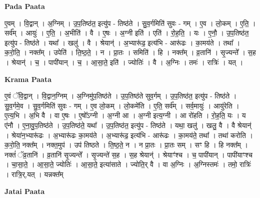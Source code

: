 \documentclass[17pt]{extarticle}
\begin{document}
\textbf{Pada Paata} \newline

ए॒वम् । वि॒द्वान् । अ॒ग्निम् । उ॒प॒तिष्ठ॑त॒ इत्यु॑प - तिष्ठ॑ते । सु॒व॒र्गमिति॑ सुवः - गम् । ए॒व । लो॒कम् । ए॒ति॒ । सर्व᳚म् । आयुः॑ । ए॒ति॒ । अ॒भीति॑ । वै । ए॒षः । अ॒ग्नी इति॑ । एति॑ । रो॒ह॒ति॒ । यः । ए॒नौ॒ । उ॒प॒तिष्ठ॑त॒ इत्यु॑प - तिष्ठ॑ते । यथा᳚ । खलु॑ । वै । श्रेयान्॑ । अ॒भ्यारू॑ढ॒ इत्य॑भि - आरू॑ढः । का॒मय॑ते । तथा᳚ । क॒रो॒ति॒ । नक्त᳚म् । उपेति॑ । ति॒ष्ठ॒ते॒ । न । प्रा॒तः । समिति॑ । हि । नक्त᳚म् । व्र॒तानि॑ । सृ॒ज्यन्ते᳚ । स॒ह । श्रेयान्॑ । च॒ । पापी॑यान् । च॒ । आ॒सा॒ते॒ इति॑ । ज्योतिः॑ । वै । अ॒ग्निः । तमः॑ । रात्रिः॑ । यत् ।  \newline


\textbf{Krama Paata} \newline

ए॒वं ॅवि॒द्वान् । वि॒द्वान॒ग्निम् । अ॒ग्निमु॑प॒तिष्ठ॑ते । उ॒प॒तिष्ठ॑ते सुव॒र्गम् । उ॒प॒तिष्ठ॑त॒ इत्यु॑प - तिष्ठ॑ते । सु॒व॒र्गमे॒व । सु॒व॒र्गमिति॑ सुवः - गम् । ए॒व लो॒कम् । लो॒कमे॑ति । ए॒ति॒ सर्व᳚म् । सर्व॒मायुः॑ । आयु॑रेति । ए॒त्य॒भि । अ॒भि वै । वा ए॒षः । ए॒षो᳚ऽग्नी । अ॒ग्नी आ । अ॒ग्नी इत्य॒ग्नी । आ रो॑हति । रो॒ह॒ति॒ यः । य ए॑नौ । ए॒ना॒वु॒प॒तिष्ठ॑ते । उ॒प॒तिष्ठ॑ते॒ यथा᳚ । उ॒प॒तिष्ठ॑त॒ इत्यु॑प - तिष्ठ॑ते । यथा॒ खलु॑ । खलु॒ वै । वै श्रेयान्॑ । श्रेया॑न॒भ्यारू॑ढः । अ॒भ्यारू॑ढः का॒मय॑ते । अ॒भ्यारू॑ढ॒ इत्य॑भि - आरू॑ढः । का॒मय॑ते॒ तथा᳚ । तथा॑ करोति । क॒रो॒ति॒ नक्त᳚म् । नक्त॒मुप॑ । उप॑ तिष्ठते । ति॒ष्ठ॒ते॒ न । न प्रा॒तः । प्रा॒तः सम् । सꣳ हि । हि नक्त᳚म् । नक्तं॑ ॅव्र॒तानि॑ । व्र॒तानि॑ सृ॒ज्यन्ते᳚ । सृ॒ज्यन्ते॑ स॒ह । स॒ह श्रेयान्॑ । श्रेयाꣳ॑श्च । च॒ पापी॑यान् । पापी॑याꣳश्च । चा॒सा॒ते॒ । आ॒सा॒ते॒ ज्योतिः॑ । आ॒सा॒ते॒ इत्या॑साते । ज्योति॒र् वै । वा अ॒ग्निः । अ॒ग्निस्तमः॑ । तमो॒ रात्रिः॑ । रात्रि॒र्,यत् । यन्नक्त᳚म् \newline

\textbf{Jatai Paata} \newline
\end{document}
